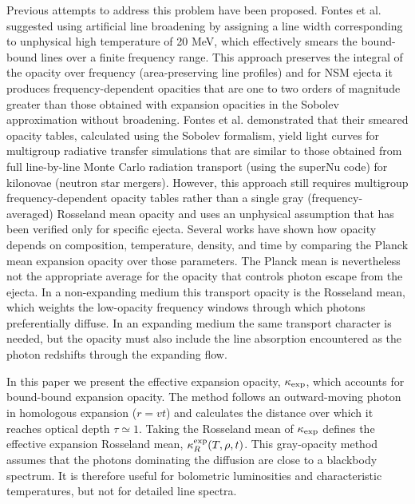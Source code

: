 \documentclass[final,5p,times,twocolumn]{elsarticle}
\begin{document}
    Previous attempts to address this problem have been proposed. Fontes et al. \cite{fontes2015opacity,fontes2017linesmeared}
    suggested using artificial 
    line broadening by assigning a line width corresponding to unphysical high temperature of 20 MeV, 
    which effectively smears the bound-bound lines 
    over a finite frequency range. This approach preserves the integral of the opacity over
    frequency (area-preserving line profiles) and for NSM ejecta it  
    produces frequency-dependent opacities that are one to two orders of magnitude greater than those
    obtained with expansion opacities in 
    the Sobolev approximation without broadening. Fontes et al. \cite{fontes2020opacity} demonstrated that
    their smeared opacity tables, 
    calculated using the Sobolev formalism, yield light curves for multigroup radiative transfer simulations
    that are similar to those 
    obtained from full line-by-line Monte Carlo radiation transport (using the superNu code) for kilonovae (neutron
    star mergers).
    However, this approach still requires multigroup frequency-dependent opacity tables rather than
    a single gray (frequency-averaged) Rosseland mean opacity and uses an unphysical assumption that
    has been verified only for specific ejecta.
    Several works \cite{deprince2024kilonova,just2022properties,tanaka2020systematic} have shown how opacity depends on composition,
    temperature, density, and time by comparing the Planck mean expansion opacity over those parameters.
    The Planck mean is nevertheless not the appropriate average for the opacity that controls photon
    escape from the ejecta. In a non-expanding medium this transport opacity is the Rosseland mean,
    which weights the low-opacity frequency windows through which photons preferentially diffuse.
    In an expanding medium the same transport character is needed, but the opacity must also include
    the line absorption encountered as the photon redshifts through the expanding flow.

    In this paper we present the effective expansion opacity, $\kappa_{\rm exp}$, which accounts for
    bound-bound expansion opacity. The method follows an outward-moving photon in homologous expansion
    ($r=vt$) and calculates the distance over which it reaches optical depth $\tau\simeq1$.
    Taking the Rosseland mean of $\kappa_{\rm exp}$ defines the effective expansion Rosseland mean,
    $\kappa_R^{\rm exp}(T,\rho,t)$.
    This gray-opacity method assumes that the photons dominating the diffusion are close to a
    blackbody spectrum. It is therefore useful for bolometric luminosities and characteristic
    temperatures, but not for detailed line spectra.
\end{document}
